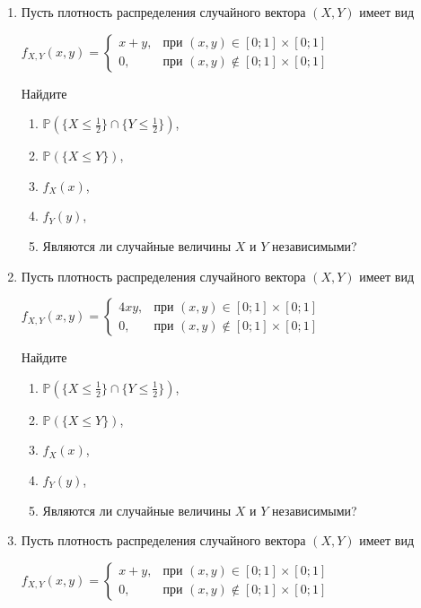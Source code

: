 \documentclass[12pt]{article}
\def \P{\mathbb{P}}
\begin{document}
\begin{enumerate}
\item Пусть плотность распределения случайного вектора $(X,Y)$ имеет вид
\begin{center} $f_{X,Y}(x,y) = \begin{cases} x+y, & \text{при } (x,y) \in [0;1] \times [0;1] \\ 0 , & \text{при } (x,y) \not\in [0;1] \times [0;1] \end{cases}$  \end{center}

Найдите
\begin{enumerate}
\item $\P(\{X \leq \frac{1}{2}\} \cap\{Y \leq \frac{1}{2}\})$,
\item $\P(\{X\leq Y\})$,
\item $f_{X}(x)$,
\item $f_{Y}(y)$,
\item Являются ли случайные величины $X$ и $Y$ независимыми?
\end{enumerate}

\item Пусть плотность распределения случайного вектора $(X,Y)$ имеет вид
\begin{center} $f_{X,Y}(x,y) = \begin{cases} 4xy, & \text{при } (x,y) \in [0;1] \times [0;1] \\ 0 , & \text{при } (x,y) \not\in [0;1] \times [0;1] \end{cases}$  \end{center}

Найдите
\begin{enumerate}
\item $\P(\{X \leq \frac{1}{2}\} \cap \{Y \leq \frac{1}{2}\})$,
\item $\P(\{X\leq Y\})$,
\item $f_{X}(x)$,
\item $f_{Y}(y)$,
\item Являются ли случайные величины $X$ и $Y$ независимыми?
\end{enumerate}

\item Пусть плотность распределения случайного вектора $(X,Y)$ имеет вид
\begin{center} $f_{X,Y}(x,y) = \begin{cases} x+y, & \text{при } (x,y) \in [0;1] \times [0;1] \\ 0 , & \text{при } (x,y) \not\in [0;1] \times [0;1] \end{cases}$  \end{center}


\end{enumerate}
\end{document}
